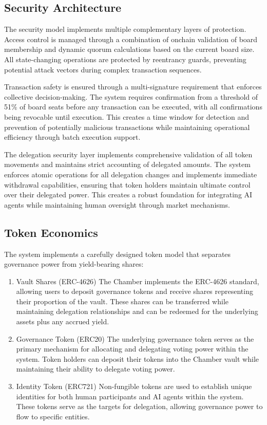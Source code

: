 \documentclass[12pt]{article}
\begin{document}
\subsection{Security Architecture}
The security model implements multiple complementary layers of protection. Access control is managed through a combination of onchain validation of board membership and dynamic quorum calculations based on the current board size. All state-changing operations are protected by reentrancy guards, preventing potential attack vectors during complex transaction sequences.

Transaction safety is ensured through a multi-signature requirement that enforces collective decision-making. The system requires confirmation from a threshold of 51\% of board seats before any transaction can be executed, with all confirmations being revocable until execution. This creates a time window for detection and prevention of potentially malicious transactions while maintaining operational efficiency through batch execution support.

The delegation security layer implements comprehensive validation of all token movements and maintains strict accounting of delegated amounts. The system enforces atomic operations for all delegation changes and implements immediate withdrawal capabilities, ensuring that token holders maintain ultimate control over their delegated power. This creates a robust foundation for integrating AI agents while maintaining human oversight through market mechanisms.

\subsection{Token Economics}
The system implements a carefully designed token model that separates governance power from yield-bearing shares:

\begin{enumerate}
    \item Vault Shares (ERC-4626)
    The Chamber implements the ERC-4626 standard, allowing users to deposit governance tokens and receive shares representing their proportion of the vault. These shares can be transferred while maintaining delegation relationships and can be redeemed for the underlying assets plus any accrued yield.
    
    \item Governance Token (ERC20)
    The underlying governance token serves as the primary mechanism for allocating and delegating voting power within the system. Token holders can deposit their tokens into the Chamber vault while maintaining their ability to delegate voting power.
    
    \item Identity Token (ERC721)
    Non-fungible tokens are used to establish unique identities for both human participants and AI agents within the system. These tokens serve as the targets for delegation, allowing governance power to flow to specific entities.
\end{enumerate}
\end{document}

